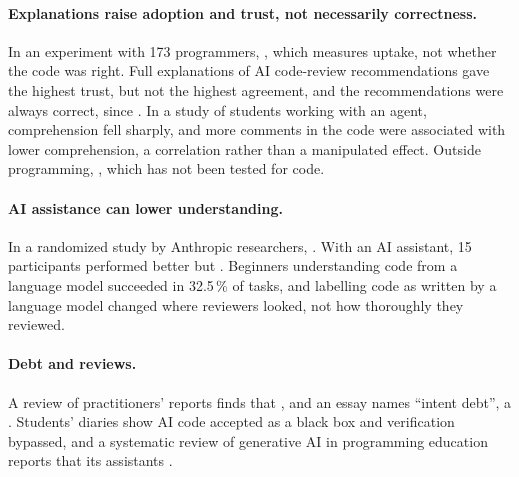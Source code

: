 \paragraph{Explanations raise adoption and trust, not necessarily
correctness.}
In an experiment with 173 programmers, , which measures uptake, not whether the code was right.
Full explanations of AI code-review recommendations gave the highest trust, but
not the highest agreement, and the recommendations were always correct, since
.
In a study of students working with an agent, comprehension fell sharply, and
more comments in the code were associated with lower comprehension, a
correlation rather than a manipulated effect\autocite{balepur2026impaired}.
Outside programming, , which
has not been tested for code.

\paragraph{AI assistance can lower understanding.}
In a randomized study by Anthropic researchers,
.
With an AI assistant, 15 participants performed better but
.
Beginners understanding code from a language model succeeded in 32.5\,\% of
tasks\autocite{zi2025beginners}, and labelling code as written by a language
model changed where reviewers looked, not how thoroughly they
reviewed\autocite{khojah2026scrutiny}.

\paragraph{Debt and reviews.}
A review of practitioners' reports finds that
, and an
essay names \enquote{intent debt}, a
.
Students' diaries show AI code accepted as a black box and verification
bypassed\autocite{ahmad2026comprehension}, and a systematic review of
generative AI in programming education reports that its assistants
.

